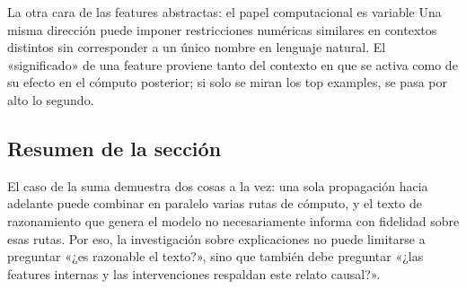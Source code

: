 \begin{knowledgebox}{La otra cara de las features abstractas: el papel computacional es variable}
Una misma dirección puede imponer restricciones numéricas similares en contextos distintos sin corresponder a un único nombre en lenguaje natural. El «significado» de una feature proviene tanto del contexto en que se activa como de su efecto en el cómputo posterior; si solo se miran los top examples, se pasa por alto lo segundo.
\end{knowledgebox}

\subsection{Resumen de la sección}

El caso de la suma demuestra dos cosas a la vez: una sola propagación hacia adelante puede combinar en paralelo varias rutas de cómputo, y el texto de razonamiento que genera el modelo no necesariamente informa con fidelidad sobre esas rutas. Por eso, la investigación sobre explicaciones no puede limitarse a preguntar «¿es razonable el texto?», sino que también debe preguntar «¿las features internas y las intervenciones respaldan este relato causal?».
